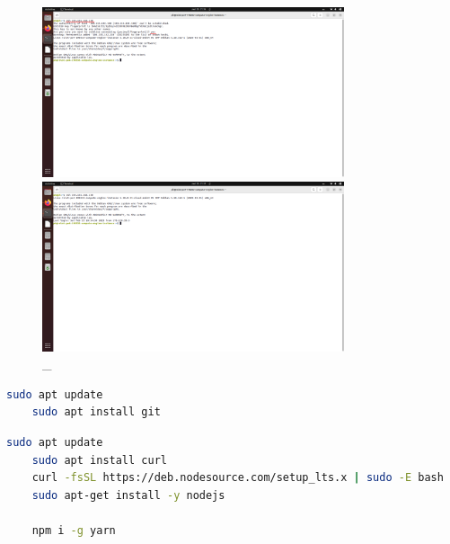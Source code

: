 \documentclass[12pt, a4paper, simple]{eskdtext}
\begin{document}
  \begin{figure}[!h]
    \centering
  
    \begin{minipage}{0.49\textwidth}
      \centering
  
      \includegraphics[height=5cm]
      {images/2023-02-25_21-36-15.png}
  
      \caption{\_}
  
      \label{fig:13}
    \end{minipage}
    \begin{minipage}{0.49\textwidth}
      \centering
  
      \includegraphics[height=5cm]
      {images/2023-02-25_21-37-30.png}
  
      \caption{\_}
  
      \label{fig:14}
    \end{minipage}
  \end{figure}

  \newpage

  \begin{lstlisting}[language=bash,name=Установка Git]
    sudo apt update
    sudo apt install git
  \end{lstlisting}

  \begin{lstlisting}[language=bash,name=Установка NodeJS и yarn]
    sudo apt update
    sudo apt install curl
    curl -fsSL https://deb.nodesource.com/setup_lts.x | sudo -E bash
    sudo apt-get install -y nodejs

    npm i -g yarn
  \end{lstlisting}
\end{document}
